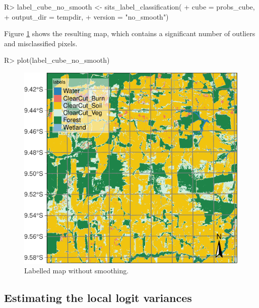 \documentclass[
  shortnames]{jss}
\begin{document}
\begin{CodeChunk}
\begin{CodeInput}
R> label_cube_no_smooth <- sits_label_classification(
+     cube = probs_cube,
+     output_dir = tempdir,
+     version = "no_smooth")
\end{CodeInput}
\end{CodeChunk}

Figure \ref{fig:map1} shows the resulting map, which contains a significant number of outliers and misclassified pixels.

\begin{CodeChunk}
\begin{CodeInput}
R> plot(label_cube_no_smooth)
\end{CodeInput}
\begin{figure}[h]

{\centering \includegraphics{Bayesian_smoothing_JSS_files/figure-latex/map1-1} 

}

\caption[Labelled map without smoothing]{Labelled map without smoothing.}\label{fig:map1}
\end{figure}
\end{CodeChunk}

\newpage

\hypertarget{estimating-the-local-logit-variances}{%
\subsection{Estimating the local logit variances}\label{estimating-the-local-logit-variances}}
\end{document}
